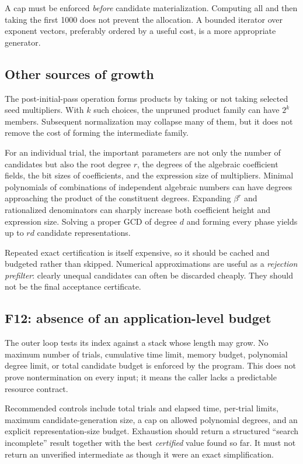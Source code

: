 \documentclass[11pt,letterpaper]{article}
\newcommand{\code}[1]{\texttt{\detokenize{#1}}}
\theoremstyle{definition}
\theoremstyle{remark}
\begin{document}
A cap must be enforced \emph{before} candidate materialization. Computing all
\code{Divisors} and then taking the first 1000 does not prevent the allocation.
A bounded iterator over exponent vectors, preferably ordered by a useful
cost, is a more appropriate generator.

\subsection{Other sources of growth}
The post-initial-pass \code{Distribute} operation forms products by taking or
not taking selected seed multipliers. With $k$ such choices, the unpruned
product family can have $2^k$ members. Subsequent normalization may collapse
many of them, but it does not remove the cost of forming the intermediate
family.

For an individual trial, the important parameters are not only the number of
candidates but also the root degree $r$, the degrees of the algebraic
coefficient fields, the bit sizes of coefficients, and the expression size of
multipliers. Minimal polynomials of combinations of independent algebraic
numbers can have degrees approaching the product of the constituent degrees.
Expanding $\beta^r$ and rationalized denominators can sharply increase both
coefficient height and expression size. Solving a proper GCD of degree $d$
and forming every phase yields up to $rd$ candidate representations.

Repeated exact certification is itself expensive, so it should be cached and
budgeted rather than skipped. Numerical approximations are useful as a
\emph{rejection prefilter}: clearly unequal candidates can often be discarded
cheaply. They should not be the final acceptance certificate.

\subsection{F12: absence of an application-level budget}
The outer loop tests its index against a stack whose length may grow. No
maximum number of trials, cumulative time limit, memory budget, polynomial
degree limit, or total candidate budget is enforced by the program. This does
not prove nontermination on every input; it means the caller lacks a
predictable resource contract.

Recommended controls include total trials and elapsed time, per-trial limits,
maximum candidate-generation size, a cap on allowed polynomial degrees, and
an explicit representation-size budget. Exhaustion should return a structured
``search incomplete'' result together with the best \emph{certified} value
found so far. It must not return an unverified intermediate as though it were
an exact simplification.
\end{document}
